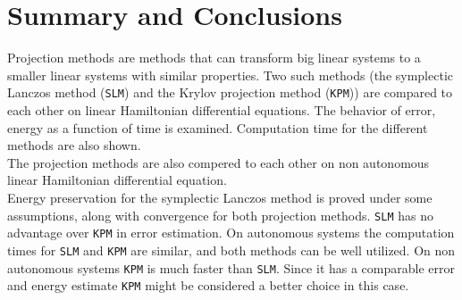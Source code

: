 \section*{Summary and Conclusions}
Projection methods are methods that can transform big linear systems to a smaller linear systems with similar properties. 
Two such methods (the symplectic Lanczos method (\texttt{SLM}) and the Krylov projection method (\texttt{KPM})) are compared to each other on linear Hamiltonian differential equations. The behavior of error, energy as a function of time is examined. Computation time for the different methods are also shown.  \\
The projection methods are also compered to each other on non autonomous linear Hamiltonian differential equation.\\

\noindent Energy preservation for the symplectic Lanczos method is proved under some assumptions, along with convergence for both projection methods. \texttt{SLM} has no advantage over \texttt{KPM} in error estimation. On autonomous systems the computation times for \texttt{SLM} and \texttt{KPM} are similar, and both methods can be well utilized. On non autonomous systems \texttt{KPM} is much faster than \texttt{SLM}. Since it has a comparable error and energy estimate \texttt{KPM} might be considered a better choice in this case.



